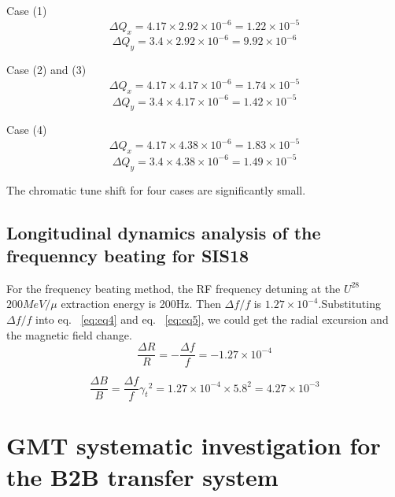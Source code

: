Case (1) 
\begin{equation}
\Delta Q_x = 4.17 \times 2.92 \times 10^{-6}=1.22 \times 10^{-5}
\end{equation}
\begin{equation}
\Delta Q_y = 3.4 \times 2.92 \times 10^{-6}=9.92 \times 10^{-6} 
\end{equation}

Case (2) and (3)
\begin{equation}
\Delta Q_x = 4.17 \times 4.17 \times 10^{-6}=1.74 \times 10^{-5}
\end{equation}
\begin{equation}
\Delta Q_y = 3.4 \times 4.17 \times 10^{-6}=1.42 \times 10^{-5} 
\end{equation}

Case (4) 
\begin{equation}
\Delta Q_x = 4.17 \times 4.38 \times 10^{-6}=1.83 \times 10^{-5}
\end{equation}
\begin{equation}
\Delta Q_y = 3.4 \times 4.38 \times 10^{-6}=1.49 \times 10^{-5} 
\end{equation}

The chromatic tune shift for four cases are significantly small.
\subsection{Longitudinal dynamics analysis of the frequenncy beating for SIS18}
For the frequency beating method, the RF frequency detuning at the $U^{28}$ $200MeV/\mu$ extraction energy is 200Hz. Then $\Delta f/f$ is $1.27 \times 10^{-4}$.Substituting $\Delta f/f$ into eq. ~\ref{eq:eq4} and eq. ~\ref{eq:eq5}, we could get the radial excursion and the magnetic field change.
\begin{equation}
\frac{\Delta{R}}{R} = - \frac{\Delta{f}}{f}= -1.27 \times 10^{-4}
\end{equation}

\begin{equation}
\frac{\Delta{B}}{B}=\frac{\Delta{f}}{f}{\gamma_t}^2=1.27 \times 10^{-4} \times {5.8^2} = 4.27 \times 10^{-3}
\end{equation}

\section{GMT systematic investigation for the B2B transfer system}
